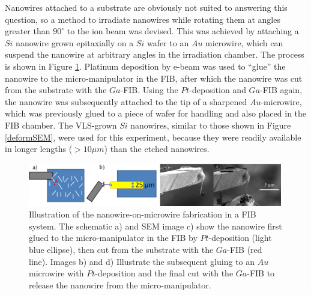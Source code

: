 Nanowires attached to a substrate are obviously not suited to answering this question, so a method to irradiate nanowires while rotating them at angles greater than $90^\circ$ to the ion beam was devised. This was achieved by attaching a $Si$ nanowire grown epitaxially on a $Si$ wafer to an $Au$ microwire, which can suspend the nanowire at arbitrary angles in the irradiation chamber. The process is shown in Figure \ref{reverseFIB}. Platinum deposition by e-beam was used to ``glue'' the nanowire to the micro-manipulator in the FIB, after which the nanowire was cut from the substrate with the $Ga$-FIB. Using the $Pt$-deposition and $Ga$-FIB again, the nanowire was subsequently attached to the tip of a sharpened $Au$-microwire, which was previously glued to a piece of wafer for handling and also placed in the FIB chamber. The VLS-grown $Si$ nanowires, similar to those shown in Figure \ref{deformSEM}, were used for this experiment, because they were readily available in longer lengths ($>10\mu m$) than the etched nanowires.

\begin{figure}[thbp]
	\centering
		\includegraphics[width=0.99\textwidth]{images/reverseFIB.jpg}
	\caption{Illustration of the nanowire-on-microwire fabrication in a FIB system. The schematic a) and SEM image c) show the nanowire first glued to the micro-manipulator in the FIB by $Pt$-deposition (light blue ellipse), then cut from the substrate with the $Ga$-FIB (red line). Images b) and d) Illustrate the subsequent gluing to an $Au$ microwire with $Pt$-deposition and the final cut with the $Ga$-FIB to release the nanowire from the micro-manipulator.}
	\label{reverseFIB}
\end{figure}

